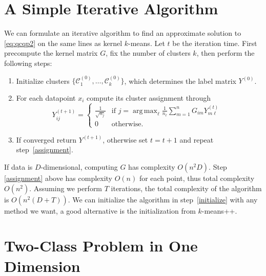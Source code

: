 \documentclass{article}
\DeclareMathOperator*{\argmax}{arg\,max}
\newcommand\C{{\mathcal{C}}}
\newcommand\Zt{Y}
\begin{document}
\section{A Simple Iterative Algorithm}
\label{sec:iterative_algo}

We can formulate an iterative algorithm to find
an approximate solution to \eqref{eq:qcqp2} on the same lines
as kernel $k$-means.
Let $t$ be the iteration time. First precompute the kernel
matrix $G$, fix the number of clusters $k$, then
perform the following steps:
\begin{enumerate}
\item \label{initialize} 
Initialize clusters $\{ \C_1^{(0)},\dotsc,\C_k^{(0)} \}$, which
determines the label matrix $\Zt^{(0)}$.
\item \label{assignment} For each datapoint $x_i$ compute
its cluster assignment through
\begin{equation}
\label{eq:algo}
\Zt^{(t+1)}_{ij} = 
\begin{cases}
\tfrac{1}{\sqrt{n_j}} & \mbox{if $j = \argmax_\ell \tfrac{1}{n_\ell} 
\sum_{m=1}^n G_{i m} \Zt^{(t)}_{m\ell}$ } \\
0 & \mbox{otherwise.}
\end{cases}
\nonumber
\end{equation}
\item If converged return $\Zt^{(t+1)}$, otherwise
set $t = t+1$ and repeat step~\ref{assignment}.
\end{enumerate}
If data is $D$-dimensional, computing $G$ has complexity
$O(n^2 D)$. Step \ref{assignment} above has complexity $O(n)$ for
each point, thus total complexity $O(n^2)$. Assuming we perform $T$ 
iterations,
the total complexity of the algorithm is $O(n^2(D + T))$.
We can initialize the algorithm in step~\ref{initialize} with any method
we want, a good alternative is the initialization from $k$-means++.


\section{Two-Class Problem in One Dimension}
\end{document}
